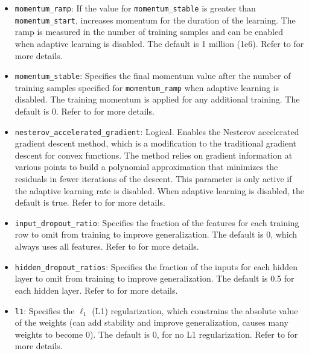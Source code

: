 {{{\begin{itemize}
\item \texttt{momentum\_ramp}: If the value for \texttt{momentum\_stable} is greater than\\ \texttt{momentum\_start}, increases momentum for the duration of the learning.  The ramp is measured in the number of training samples and can be enabled when adaptive learning is disabled. The default is 1 million (1e6). Refer to {\textbf{}} for more details.

\item \texttt{momentum\_stable}: Specifies the final momentum value after the number of training samples specified for \texttt{momentum\_ramp} when adaptive learning is disabled. The training momentum is applied for any additional training. The default is 0.  Refer to {\textbf{}} for more details.

\item \texttt{nesterov\_accelerated\_gradient}:  Logical.  Enables the Nesterov accelerated gradient descent method, which is a modification to the traditional gradient descent for convex functions. The method relies on gradient information at various points to build a polynomial approximation that minimizes the residuals in fewer iterations of the descent. This parameter is only active if the adaptive learning rate is disabled.  When adaptive learning is disabled, the default is true. Refer to {\textbf{}} for more details.

\item \texttt{input\_dropout\_ratio}: Specifies the fraction of the features for each training row to omit from training to improve generalization. The default is 0, which always uses all features.  Refer to {\textbf{}} for more details.

\item \texttt{hidden\_dropout\_ratios}:  Specifies the fraction of the inputs for each hidden layer to omit from training to improve generalization. The default is 0.5 for each hidden layer.  Refer to {\textbf{}} for more details.

\item \texttt{l1}: Specifies the $\ell_1$ (L1) regularization, which constrains the absolute value of the weights (can add stability and improve generalization, causes many weights to become 0). The default is 0, for no L1 regularization. Refer to {\textbf{}} for more details.


\end{itemize}}}}
